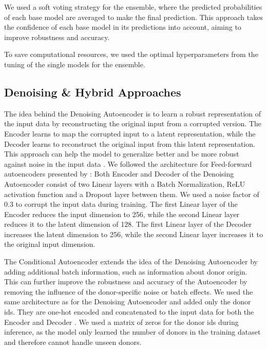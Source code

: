 \documentclass[11pt]{article}
\begin{document}
We used a soft voting strategy for the ensemble, where the predicted probabilities of each base model are averaged to make the final prediction. This approach takes the confidence of each base model in its predictions into account, aiming to improve robustness and accuracy.

To save computational resources, we used the optimal hyperparameters from the tuning of the single models for the ensemble.


\subsection{Denoising \& Hybrid Approaches}\label{sec:methods:denoising-hybrid}

The idea behind the Denoising Autoencoder is to learn a robust representation of the input data by reconstructing the original input from a corrupted version. The Encoder learns to map the corrupted input to a latent representation, while the Decoder learns to reconstruct the original input from this latent representation. This approach can help the model to generalize better and be more robust against noise in the input data \cite{lin_scdilt_2025}.
We followed the architecture for Feed-forward autoencoders presented by \textcite{hayashi_conformer-based_2020}: Both Encoder and Decoder of the Denoising Autoencoder consist of two Linear layers with a Batch Normalization, ReLU activation function and a Dropout layer between them.
We used a noise factor of 0.3 to corrupt the input data during training. The first Linear layer of the Encoder reduces the input dimension to 256, while the second Linear layer reduces it to the latent dimension of 128. The first Linear layer of the Decoder increases the latent dimension to 256, while the second Linear layer increases it to the original input dimension.

The Conditional Autoencoder extends the idea of the Denoising Autoencoder by adding additional batch information, such as information about donor origin. This can further improve the robustness and accuracy of the Autoencoder by removing the influence of the donor-specific noise or batch effects. We used the same architecture as for the Denoising Autoencoder and added only the donor ids. They are one-hot encoded and concatenated to the input data for both the Encoder and Decoder \cite{lin_scdilt_2025, hayashi_conformer-based_2020}.
We used a matrix of zeros for the donor ids during inference, as the model only learned the number of donors in the training dataset and therefore cannot handle unseen donors. %
\end{document}
